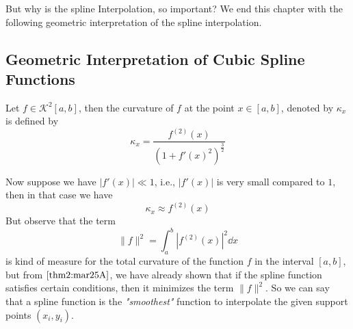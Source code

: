 But why is the spline Interpolation, so important? We end this chapter with the following geometric interpretation of the spline interpolation. 

\subsection{Geometric Interpretation of Cubic Spline Functions}

\begin{defn}\label{defn3:mar25A}
    Let $f \in \mathcal{K}^2[a,b]$, then the curvature of $f$ at the point $x \in [a,b]$, denoted by $\kappa_x$ is defined by 
    \[
        \kappa_x = \frac{f^{(2)}(x)}{(1+f'(x)^2)^{\frac{3}{2}}}  
    \]
\end{defn}

Now suppose we have $|f'(x)| \ll 1$, i.e., $|f'(x)|$ is very small compared to $1$, then in that case we have 
\[
    \kappa_x \approx f^{(2)}(x)  
\]
But observe that the term 
\[ 
    \|f\|^2 = \int_a^b |f^{(2)}(x)|^2 \dd{x}    
\]
is kind of measure for the total curvature of the function $f$ in the interval $[a,b]$, but from  $\ref{thm2:mar25A}$, we have already shown that if the spline function satisfies certain conditions, then it minimizes the term $\|f\|^2$. So we can say that a spline function is the \textit{"smoothest"} function to interpolate the given support points $(x_i,y_i)$.